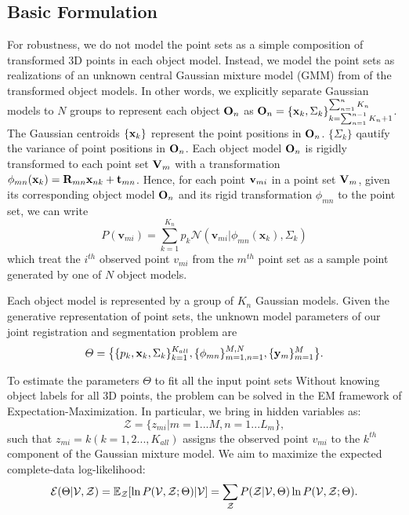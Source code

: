 \subsection{Basic Formulation}
For robustness, we do not model the point sets as a simple composition of transformed 3D points in each object model. Instead, we model the point sets as realizations of an unknown central Gaussian mixture model (GMM) from of the transformed object models. In other words, we explicitly separate Gaussian models to $N$ groups to represent each object $\mathbf{O}_{n}$ as $\mathbf{O}_{n}=\{\mathbf{x}_{k},\Sigma_{k}\}^{\sum^{n}_{n=1}K_n}_{k=\sum^{n-1}_{n=1}K_n+1}$. The Gaussian centroids $\{\mathbf{x}_{k}\}$ represent the point positions in $\mathbf{O}_{n}$. $\{\Sigma_{k}\}$ qautify the variance of point positions in $\mathbf{O}_{n}$.
Each object model $\mathbf{O}_{n}$ is rigidly transformed to each point set $\mathbf{V}_m$ with a transformation $\phi_{mn}(\mathbf{x}_{k})=\mathbf{R}_{mn}\mathbf{x}_{nk}+\mathbf{t}_{mn}$.
%
Hence, for each point $\mathbf{v}_{mi}$ in a point set $\mathbf{V}_m$, given its corresponding object model $\mathbf{O}_{n}$ and its rigid transformation $\phi_{mn}$ to the point set, we can write
\begin{equation}
\label{equ:model}
P(\pmb{v}_{mi})=\sum^{K_n}_{k=1}p_k\mathcal{N}(\pmb{v}_{mi}|\phi_{mn}(\pmb{x}_k),\Sigma_k)
\end{equation}
which treat the $i^{th}$ observed point $v_{mi}$ from the $m^{th}$ point set as a sample point generated by one of $N$ object models.

Each object model is represented by a group of $K_n$ Gaussian models.
Given the generative representation of point sets, the unknown model parameters of our joint registration and segmentation problem are
%
\begin{displaymath}
\varTheta=\big \{\{p_k,\mathbf{x}_k,\Sigma_k\}_{k=1}^{K_{all}},\{\phi_{mn}\}_{m=1,n=1}^{M,N}, \{\mathbf{y}_{m}\}^{M}_{m=1}\big\}.
\end{displaymath}
 

To estimate the parameters $\Theta$ to fit all the input point sets Without knowing object labels for all 3D points, the problem can be solved in the EM framework of Expectation-Maximization. 
%
In particular, we bring in hidden variables as: 
\begin{equation}
\mathcal{Z}=\{z_{mi}|m=1...M,n=1...L_m\},
\end{equation}
%
such that $z_{mi}=k(k=1,2...,K_{all})$ assigns the observed point $v_{mi}$ to the $k^{th}$ component of the Gaussian mixture model. 
%
We aim to maximize the expected complete-data log-likelihood:
\begin{equation}
\label{equ:obj0}
\mathcal{E}(\Theta|\mathcal{V},\mathcal{Z})=\mathbb{E}_{\mathcal{Z}}[\ln P(\mathcal{V},\mathcal{Z};\Theta)|\mathcal{V}]={\sum_{\mathcal{Z}}P(\mathcal{Z}|\mathcal{V},\Theta)\ln{P(\mathcal{V},\mathcal{Z};\Theta)}}.
\end{equation}


